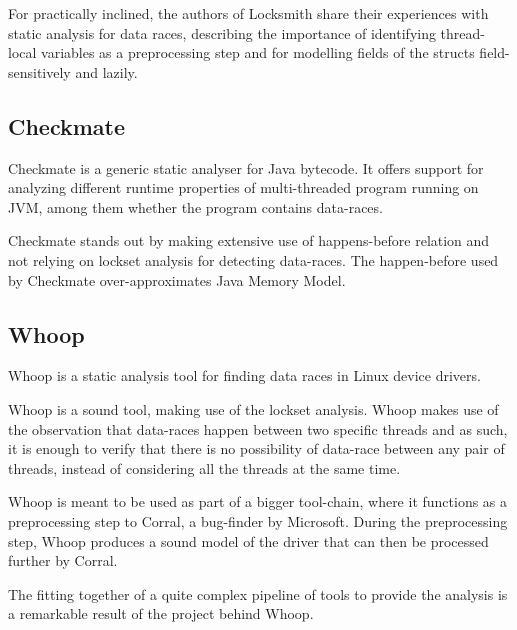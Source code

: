 \documentclass[..thesis.tex]{subfiles}
\begin{document}
For practically inclined, the authors of Locksmith share their experiences with static analysis for data races, describing the importance of identifying thread-local variables as a preprocessing step and for modelling fields of the structs field-sensitively and lazily\cite{pratikakis_locksmith_2011}.




\subsection{Checkmate}

Checkmate\cite{ferrara_checkmate_2009} is a generic static analyser for Java bytecode. It offers support for analyzing different runtime properties of multi-threaded program running on JVM, among them whether the program contains data-races.

Checkmate stands out by making extensive use of happens-before relation and not relying on lockset analysis for detecting data-races. The happen-before used by Checkmate over-approximates Java Memory Model.





\subsection{Whoop}

Whoop\cite{deligiannis_fast_2015} is a static analysis tool for finding data races in Linux device drivers. 

Whoop is a sound tool, making use of the lockset analysis. Whoop makes use of the observation that data-races happen between two specific threads and as such, it is enough to verify that there is no possibility of data-race between any pair of threads, instead of considering all the threads at the same time.

Whoop is meant to be used as part of a bigger tool-chain, where it functions as a preprocessing step to Corral, a bug-finder by Microsoft. During the preprocessing step, Whoop produces a sound model of the driver that can then be processed further by Corral.

The fitting together of a quite complex pipeline of tools to provide the analysis is a remarkable result of the project behind Whoop.
\end{document}
